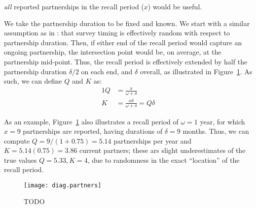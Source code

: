 \emph{all} reported partnerships in the recall period ($x$) would be useful.
\par
We take the partnership duration to be fixed and known.
We start with a similar assumption as in :
that survey timing is effectively random with respect to partnership duration.
Then, if either end of the recall period would capture an ongoing partnership,
the intersection point would be, on average, at the partnership mid-point.
Thus, the recall period is effectively extended
by half the partnership duration $\delta/2$ on each end, and $\delta$ overall,
as illustrated in Figure~\ref{fig:diag.partners}.
As such, we can define $Q$ and $K$ as:
\begin{alignat}{1}
  Q &= \frac{x}{\omega + \delta}\\
  K &= \frac{x \delta}{\omega + \delta} = Q \delta
\end{alignat}
\par
As an example, Figure~\ref{fig:diag.partners} also illustrates
a recall period of $\omega = 1$ year,
for which $x = 9$ partnerships are reported,
having durations of $\delta = 9$ months.
Thus, we can compute
$Q = 9/(1+0.75) = 5.14$ partnerships per year and
$K = 5.14(0.75) = 3.86$ current partners;
these ars slight underestimates of the true values $Q = 5.33, K = 4$,
due to randomness in the exact ``location'' of the recall period.
\begin{figure}
  \centering\texttt{[image: diag.partners]}
  \caption{TODO}
  \label{fig:diag.partners}
\end{figure}

